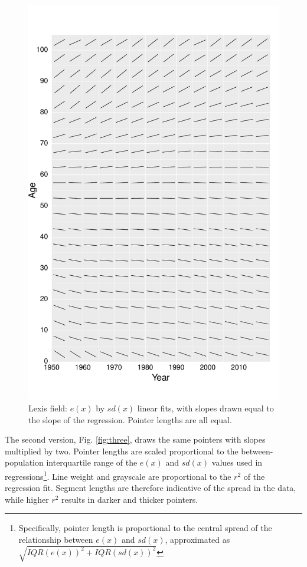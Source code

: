 \documentclass[10pt, twoside, parskip=half]{article}
\begin{document}
\begin{figure}[!t]

{\centering \includegraphics[width=0.8\linewidth]{Figures/Fig2} 

}

\caption{Lexis field: \(e(x)\) by \(sd(x)\) linear fits, with slopes drawn equal to the slope of the regression. Pointer lengths are all equal.}\label{fig:two}
\end{figure}

The second version, Fig. \ref{fig:three}, draws the same pointers with slopes multiplied by two. Pointer lengths are scaled proportional to the between-population interquartile range of the \(e(x)\) and \(sd(x)\) values used in regressions\footnote{Specifically, pointer length is proportional to the central spread of the relationship between \(e(x)\) and \(sd(x)\), approximated as \(\sqrt{IQR(e(x))^2 + IQR(sd(x))^2}\)}. Line weight and grayscale are proportional to the \(r^2\) of the regression fit. Segment lengths are therefore indicative of the spread in the data, while higher \(r^2\) results in darker and thicker pointers.
\end{document}
